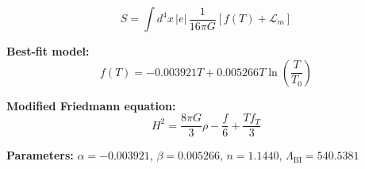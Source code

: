 
\begin{equation}
  S = \int d^4x \, |e| \, \frac{1}{16\pi G} \left[ f(T) + \mathcal{L}_m \right]
\end{equation}

\textbf{Best-fit model:}
\begin{equation}
  f(T) = -0.003921 T + 0.005266 T \ln\!\left(\frac{T}{T_0}\right)
\end{equation}

\textbf{Modified Friedmann equation:}
\begin{equation}
  H^2 = \frac{8\pi G}{3} \rho - \frac{f}{6} + \frac{T f_T}{3}
\end{equation}

\textbf{Parameters:}
$\alpha = -0.003921$, \quad
$\beta = 0.005266$, \quad
$n = 1.1440$, \quad
$\Lambda_{\text{BI}} = 540.5381$